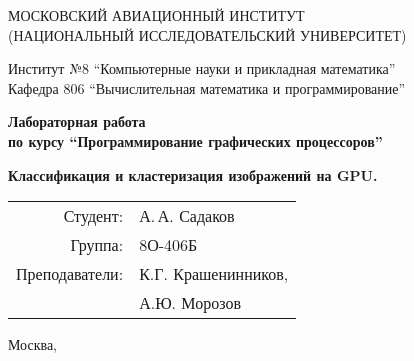 \begin{titlepage}
\begin{center}

МОСКОВСКИЙ АВИАЦИОННЫЙ ИНСТИТУТ\\ (НАЦИОНАЛЬНЫЙ ИССЛЕДОВАТЕЛЬСКИЙ УНИВЕРСИТЕТ)

\vspace{18pt}

Институт №8 \enquote{Компьютерные науки и прикладная математика}\\
Кафедра 806 \enquote{Вычислительная математика и программирование}


\vspace{68pt}
\textbf{
Лабораторная работа \\ по курсу \enquote{Программирование графических процессоров}
}

\vspace{48pt}
\textbf{
Классификация и кластеризация изображений на GPU.
}

\end{center}

\vspace{160pt}

\begin{flushright}
\begin{tabular}{rl}
Студент: & А.\,А. Садаков \\
Группа: & 8О-406Б \\
Преподаватели: & К.Г. Крашенинников,\\
 & А.Ю. Морозов\\
\end{tabular}
\end{flushright}

\vfill

\begin{center}
Москва, \the\year
\end{center}
\end{titlepage}

\pagebreak
